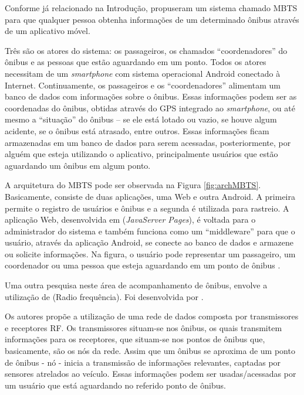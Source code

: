 Conforme já relacionado na Introdução,  propuseram um sistema chamado MBTS para que qualquer pessoa obtenha informações de um determinado ônibus através de um aplicativo móvel. 

Três são os atores do sistema: os passageiros, os chamados ``coordenadores'' do ônibus e as pessoas que estão aguardando em um ponto. Todos os atores necessitam de um \textit{smartphone} com sistema operacional Android conectado à Internet. Continuamente, os passageiros e os ``coordenadores'' alimentam um banco de dados com informações sobre o ônibus. Essas informações podem ser as coordenadas do ônibus, obtidas através do GPS integrado ao \emph{smartphone}, ou até mesmo a ``situação'' do ônibus -- se ele está lotado ou vazio, se houve algum acidente, se o ônibus está atrasado, entre outros. Essas informações ficam armazenadas em um banco de dados para serem acessadas, posteriormente, por alguém que esteja utilizando o aplicativo, principalmente usuários que estão aguardando um ônibus em algum ponto. 

A arquitetura do MBTS pode ser observada na Figura \ref{fig:archMBTS}. Basicamente, consiste de duas aplicações, uma Web e outra Android. A primeira permite o registro de usuários e ônibus e a segunda é utilizada para rastreio. A aplicação Web, desenvolvida em  (\textit{JavaServer Pages}), é voltada para o administrador do sistema e também funciona como um ``middleware'' para que o usuário, através da aplicação Android, se conecte ao banco de dados e armazene ou solicite informações. Na figura, o usuário pode representar um passageiro, um coordenador ou uma pessoa que esteja aguardando em um ponto de ônibus \cite{sujatha}.

Uma outra pesquisa neste área de acompanhamento de ônibus, envolve a utilização de  (Radio frequência). Foi desenvolvida por .

Os autores propõe a utilização de uma rede de dados composta por transmissores e receptores RF. Os transmissores situam-se nos ônibus, os quais transmitem informações para os receptores, que situam-se nos pontos de ônibus que, basicamente, são os nós da rede. Assim que um ônibus se aproxima de um ponto de ônibus - nó - inicia a transmissão de informações relevantes, captadas por sensores atrelados ao veículo. Essas informações podem ser usadas/acessadas por um usuário que está aguardando no referido ponto de ônibus. 

